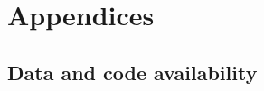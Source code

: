 \documentclass[unnumsec,webpdf,modern,medium]{oup-authoring-template}
\begin{document}


\newpage









\renewcommand{\thesection}{\Alph{section}}
\newpage 

\section{Appendices}












\subsection{Data and code availability}
\label{appendix_supp_data_availability}
\end{document}
